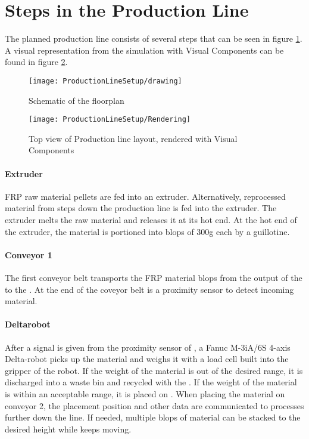 \section{Steps in the Production Line}
The planned production line consists of several steps that can be seen in figure \ref{fig:ProdLineSchem}. A visual representation from the simulation with Visual Components can be found in figure \ref{fig:ProdLineVisComp}.

\begin{figure}[H]
	\texttt{[image: ProductionLineSetup/drawing]}
	\caption{Schematic of the floorplan \cite{AliyaThesis}}
	\label{fig:ProdLineSchem}
\end{figure}

\begin{figure}[h]
	\texttt{[image: ProductionLineSetup/Rendering]}
	\caption{Top view of Production line layout, rendered with Visual Components \cite{AliyaThesis}}
	\label{fig:ProdLineVisComp}
\end{figure}



\paragraph{Extruder} \label{sec:extruder}
\ac{FRP} raw material pellets are fed into an extruder. 
Alternatively, reprocessed material from steps down the production line is fed into the extruder.
The extruder melts the raw material and releases it at its hot end. 
At the hot end of the extruder, the material is portioned into blops of 300g each by a guillotine.

\paragraph{Conveyor 1} \label{sec:conveyor1}
The first conveyor belt transports the \ac{FRP} material blops from the output of the  to the . At the end of the coveyor belt is a proximity sensor to detect incoming material.

\paragraph{Deltarobot} \label{sec:Deltarobot}
After a signal is given from the proximity sensor of , a  Fanuc M-3iA/6S 4-axis Delta-robot picks up the material and weighs it with a load cell built into the gripper of the robot. 
If the weight of the material is out of the desired range, it is discharged into a waste bin and recycled with the .
If the weight of the material is within an acceptable range, it is placed on .
When placing the material on conveyor 2, the placement position and other data are communicated to processes further down the line.
If needed, multiple blops of material can be stacked to the desired height while  keeps moving.


